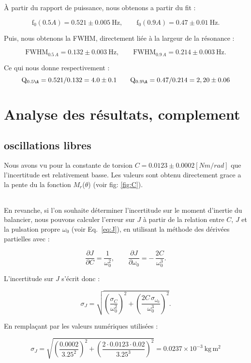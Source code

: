 \vspace{0.5cm}
À partir du rapport de puissance, nous obtenons a partir du fit :

\[
	\mathrm{f_0}(0.5A) = 0.521 \pm 0.005~\mathrm{Hz}, \qquad
\mathrm{f_0}(0.9A) = 0.47 \pm 0.01~\mathrm{Hz}.
\]

Puis, nous obtenons la FWHM, directement liée à la largeur de la résonance :

\[
\mathrm{FWHM}_{0.5\,A} = 0.132 \pm 0.003~\mathrm{Hz}, \qquad
\mathrm{FWHM}_{0.9\,A} = 0.214 \pm 0.003~\mathrm{Hz}.
\]

Ce qui nous donne respectivement :
\[
	\mathrm{Q}_{0.5\A} = 0.521 / 0.132 = 4.0 \pm 0.1 \qquad
	\mathrm{Q}_{0.9\A} = 0.47 / 0.214 = 2,20 \pm 0.06
\]



\section{Analyse des résultats, complement}

\subsection{oscillations libres}

Nous avons vu pour la constante de torsion $C = 0.0123 \pm 0.0002 [Nm / rad]$ que l'incertitude est relativement basse. Les valeurs sont obtenu directement grace a la pente du la fonction $M_r$($\theta$) (voir fig: \ref{fig:C}).

\\

En revanche, si l'on souhaite déterminer l'incertitude sur le moment d'inertie du balancier,
nous pouvons calculer l'erreur sur $J$ à partir de la relation entre $C$, $J$ et la pulsation propre
$\omega_0$ (voir Eq.~\ref{eq:J}), en utilisant la méthode des dérivées partielles avec :

\[
\frac{\partial J}{\partial C} = \frac{1}{\omega_0^2},
\qquad
\frac{\partial J}{\partial \omega_0}
= -\,\frac{2C}{\omega_0^3}.
\]

L'incertitude sur $J$ s'écrit donc :

\[
\sigma_J = 
\sqrt{
\left( \frac{\sigma_C}{\omega_0^2} \right)^2
+
\left( \frac{2C\,\sigma_{\omega_0}}{\omega_0^3} \right)^2
}.
\]

En remplaçant par les valeurs numériques utilisées :

\[
\sigma_J =
\sqrt{
\left( \frac{0.0002}{3.25^2} \right)^2 +
\left( \frac{2 \cdot 0.0123 \cdot 0.02}{3.25^3} \right)^2
}
= 0.0237 \times 10^{-3}\ \mathrm{kg\,m^2}
\]



